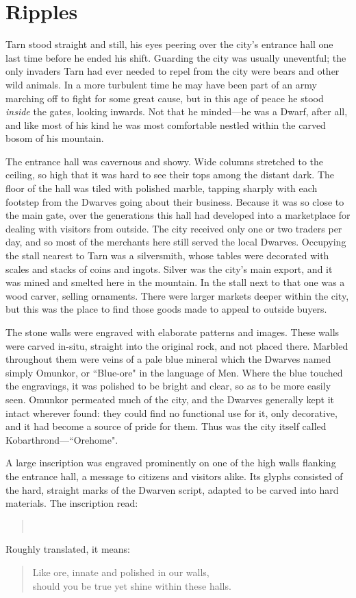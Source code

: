 \chapter{Ripples}
Tarn stood straight and still, his eyes peering over the city's entrance hall one last time before he ended his shift.  Guarding the city was usually uneventful; the only invaders Tarn had ever needed to repel from the city were bears and other wild animals.  In a more turbulent time he may have been part of an army marching off to fight for some great cause, but in this age of peace he stood \emph{inside} the gates, looking inwards.  Not that he minded---he was a Dwarf, after all, and like most of his kind he was most comfortable nestled within the carved bosom of his mountain.

The entrance hall was cavernous and showy.  Wide columns stretched to the ceiling, so high that it was hard to see their tops among the distant dark.  The floor of the hall was tiled with polished marble, tapping sharply with each footstep from the Dwarves going about their business.  Because it was so close to the main gate, over the generations this hall had developed into a marketplace for dealing with visitors from outside.  The city received only one or two traders per day, and so most of the merchants here still served the local Dwarves.  Occupying the stall nearest to Tarn was a silversmith, whose tables were decorated with scales and stacks of coins and ingots.  Silver was the city's main export, and it was mined and smelted here in the mountain.  In the stall next to that one was a wood carver, selling ornaments.  There were larger markets deeper within the city, but this was the place to find those goods made to appeal to outside buyers.

The stone walls were engraved with elaborate patterns and images.  These walls were carved in-situ, straight into the original rock, and not placed there.  Marbled throughout them were veins of a pale blue mineral which the Dwarves named simply Omunkor, or ``Blue-ore" in the language of Men.  Where the blue touched the engravings, it was polished to be bright and clear, so as to be more easily seen.  Omunkor permeated much of the city, and the Dwarves generally kept it intact wherever found: they could find no functional use for it, only decorative, and it had become a source of pride for them.  Thus was the city itself called Kobarthrond---``Orehome".

A large inscription was engraved prominently on one of the high walls flanking the entrance hall, a message to citizens and visitors alike.  Its glyphs consisted of the hard, straight marks of the Dwarven script, adapted to be carved into hard materials.  The inscription read:
\begin{verse}
\\
\end{verse}
Roughly translated, it means:
\begin{verse}
Like ore, innate and polished in our walls,\\
should you be true yet shine within these halls.
\end{verse}

